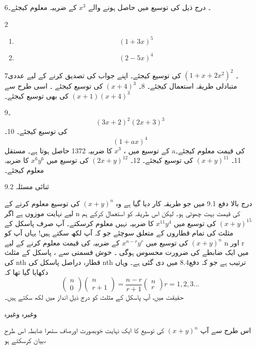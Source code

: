 6۔ درج ذیل کی توسیع میں حاصل ہونے والے
 \(x^{3}\)
  کے ضریبہ معلوم کیجئے۔ 
  \begin{multicols}{2}
   \begin{enumerate}
      \item
 \[(1+3x)^5\]
    \item
    \[(2-5x)^4\]
          \end{enumerate}
    \end{multicols}

7۔ 
   \((1+x+2x^{2})^{2}\)
کی توسیع کیجئے۔ اپنے جواب کی تصدیق کرنے کے لیے عددی متبادلی طریقہ استعمال کیجئے۔ 
8۔ 
    \((x+4)^{3}\)
کی توسیع کیجئے ۔ اسی طرح سے
 \((x+1)(x+4)^{3}\)
کی بھی توسیع کیجئے۔ 

9۔ 
 \[ (3x+2)^{2}(2x+3)^{3}\]
کی توسیع کیجئے۔ 
10۔ 
  \[(1+ax)^{4}\]
کے توسیع میں ،
\(x^{3}\)
کا ضربیہ 
1372
حاصل ہوتا ہے۔ مستقل aکی قیمت معلوم کیجئے۔ 
11۔ 
 \((x+y)^{11}\)
کی توسیع کیجئے۔ 
12۔
  \((2x+y)^{12}\)
کی توسیع میں 
 \( x^{6}y^{6}\)
کا ضربیہ معلوم کیجئے۔ 

9.2 ثنائی مسئلہ

درج بالا دفع 9.1 میں جو طریقہ کار دیا گیا ہے وہ 
  \((x+y)^n\)
کی توسیع معلوم کرنے کے لیے نہایت موزوں ہے اگر n کی قیمت بہت چھوٹی ہو۔ لیکن اس طریقہ کو استعمال کرکے ہم 
  \((x+y)^{15}\)
کی توسیع میں 
 \( x^{11} y^4\)
کا ضربیہ نہیں معلوم کرسکتے۔ آپ صرف پاسکل کے مثلث کی تمام قطاروں کے متعلق سوچئے جو کہ آپ لکھ سکتے ہیں! یہاں آپ کو
  \((x+y)^{n}\)
کی توسیع میں 
  \(x^{n-r}y^r\)
کے ضربیہ کی قیمت معلوم کرنے کے لیے n اور r میں ایک ضابطے کی ضرورت محسوس ہوگی ۔ 
خوش قسمتی سے ، پاسکل کے مثلث کی nth قطار، دراصل پاسکل کی nth ترتیب ہے جو کہ دفع8.4 میں دی گئی ہے۔ وہاں دکھایا گیا تھا کہ
 \[\begin{pmatrix}
  n\\
  0
  \end{pmatrix}
   \begin{pmatrix}
     n\\r+1
     \end{pmatrix}
    =\frac{n-r}{r+1}
     \begin{pmatrix}
    n\\r
     \end{pmatrix}
     r=1,2,3...\]
حقیقت میں، آپ پاسکل کے مثلث کو درج ذیل انداز میں لکھ سکتے ہیں۔ 

وغیرہ وغیرہ 

اس طرح سے آپ 
 \((x+y)^n\)
کی توسیع کا ایک نہایت خوبصورت اورصاف ستھرا ضابطہ اس طرح بیان کرسکتے ہو،

